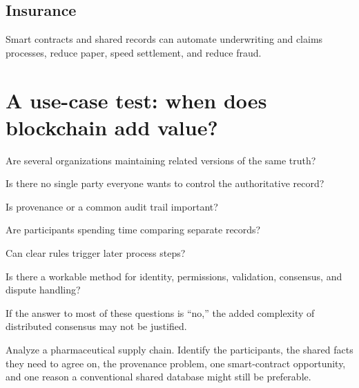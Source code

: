 \subsection{Insurance}

Smart contracts and shared records can automate underwriting and claims processes, reduce paper, speed settlement, and reduce fraud.

\section{A use-case test: when does blockchain add value?}

\begin{mlsteps}
  \item {} Are several organizations maintaining related versions of the same truth?
  \item {} Is there no single party everyone wants to control the authoritative record?
  \item {} Is provenance or a common audit trail important?
  \item {} Are participants spending time comparing separate records?
  \item {} Can clear rules trigger later process steps?
  \item {} Is there a workable method for identity, permissions, validation, consensus, and dispute handling?
\end{mlsteps}

If the answer to most of these questions is ``no,'' the added complexity of distributed consensus may not be justified.

\begin{tryit}
Analyze a pharmaceutical supply chain. Identify the participants, the shared facts they need to agree on, the provenance problem, one smart-contract opportunity, and one reason a conventional shared database might still be preferable.
\end{tryit}

